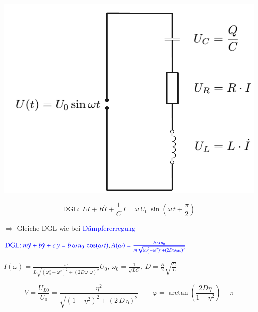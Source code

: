 \begin{minipage}{0.3\linewidth}
\includegraphics[width=\linewidth]{Bilder/Wellen-Optik/schwingkreis}  \\
\end{minipage}
\hfill
\begin{minipage}{0.68\linewidth}
$$ \boxed{ \text{DGL: } L \ddot{I} + R \dot{I} + \frac{1}{C} \, I = \omega \, U_0 \,\sin(\omega \, t + \frac{\pi}{2}) } $$

$\Rightarrow$ Gleiche DGL wie bei \textcolor{blue}{Dämpfererregung} \\
\end{minipage}


$ \textcolor{blue}{\text{DGL: } m \ddot{y} + b \dot{y} + c \, y = b \, \omega \, u_0 \, \cos(\omega \, t) }, \textcolor{blue}{A(\omega) =  \frac{b \, \omega \, u_0}{m\sqrt{(\omega_0^2 -\omega^2)^2 + (2D \omega_0 \omega)^2}} } $ \\

\vspace{0.1cm}


$ \boxed{ I(\omega) =  \frac{\omega}{L\sqrt{(\omega_0^2 -\omega^2)^2 + (2D \omega_0 \omega)^2}}U_0, \, \omega_0 = \frac{1}{\sqrt{LC}} , \, D = \frac{R}{2}\sqrt{\frac{C}{L}}} $ 

\vspace{0.1cm}

$$ \boxed{ V = \frac{U_{L0}}{U_0} = \frac{\eta^2}{\sqrt{(1 - \eta^2)^2 + (2 \, D \, \eta)^2}} } \qquad \boxed{ \varphi = \arctan \left( \frac{2 D \eta}{1 - \eta^2} \right) - \pi } $$ 



